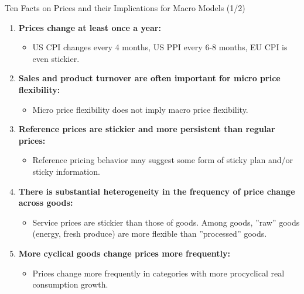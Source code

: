 \documentclass[10pt,c,aspectratio=1610,handout]{beamer}
\begin{document}
\begin{frame}{Ten Facts on Prices and their Implications for Macro Models (1/2)}%
  \begin{enumerate}%
    \item \textbf{Prices change at least once a year:}%
    \begin{itemize}%
      \item[$\rightarrow$] US CPI changes every 4 months, US PPI every 6-8 months, EU CPI is even stickier.%
    \end{itemize}%
    \vspace*{0.1in}%
    \pause%
    \item \textbf{Sales and product turnover are often important for micro price flexibility:}%
    \begin{itemize}%
      \item[$\rightarrow$] Micro price flexibility does not imply macro price flexibility.%
    \end{itemize}%
    \vspace*{0.1in}%
    \pause%
    \item \textbf{Reference prices are stickier and more persistent than regular prices:}%
    \begin{itemize}%
      \item[$\rightarrow$] Reference pricing behavior may suggest some form of sticky plan and/or sticky information.%
    \end{itemize}%
    \vspace*{0.1in}%
    \pause%
    \item \textbf{There is substantial heterogeneity in the frequency of price change across goods:}%
    \begin{itemize}%
      \item[$\rightarrow$] Service prices are stickier than those of goods. Among goods, ''raw'' goods (energy, fresh produce) are more flexible than ''processed'' goods.%
    \end{itemize}%
    \vspace*{0.1in}%
    \pause%
    \item \textbf{More cyclical goods change prices more frequently:}%
    \begin{itemize}%
      \item[$\rightarrow$] Prices change more frequently in categories with more procyclical real consumption growth.%
    \end{itemize}%
  \end{enumerate}%
\end{frame}%
\end{document}
